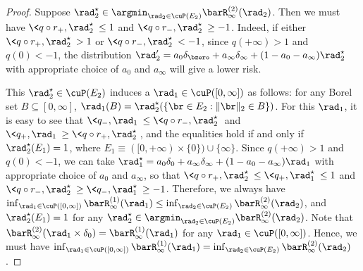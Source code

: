 \documentclass[11pt]{article}
\begin{document}
\begin{proof}
%
%
Suppose $\rad_2^\star \in \argmin_{\rad_2 \in \cuP(E_2)} \barR_\infty^{(2)}(\rad_2)$. Then we must have $\< q \circ r_+, \rad_2^\star\> \le 1$ and $\< q \circ r_-, \rad_2^\star \> \ge -1$. Indeed, if either $\< q \circ r_+, \rad_2^\star\> > 1$ or $\< q \circ r_-, \rad_2^\star\> < -1$, since $q(+\infty) > 1$ and $q(0) < -1$, the distribution $\rad_2' = a_0 \delta_\bzero + a_\infty \delta_\infty + (1-a_0 - a_\infty) \rad_2^\star$ with appropriate choice of $a_0$ and $a_\infty$ will give a lower risk. 

This $\rad_2^\star \in \cuP(E_2)$ induces a $\rad_1 \in \cuP([0, \infty])$ as follows: for any Borel set $B \subseteq [0, \infty]$, $\rad_1(B) = \rad_2^\star(\{\br \in E_2 : \| \br \|_2 \in B \})$. For this $\rad_1$, it is easy to see that $\<q_-, \rad_1 \> \le \<q \circ r_-, \rad_2^\star \>$ and $\<q_+, \rad_1 \> \ge \<q \circ r_+, \rad_2^\star \>$, and the equalities hold if and only if $\rad_2^\star(E_1) = 1$, where $E_1 \equiv  ([0, +\infty) \times \{ 0 \}) \cup \{ \infty \}$. Since $q(+\infty) > 1$ and $q(0) < -1$, we can take $\rad_1^\star = a_0 \delta_0 + a_\infty \delta_\infty + (1 - a_0 - a_\infty) \rad_1$ with appropriate choice of $a_0$ and $a_\infty$, so that $\< q \circ r_+, \rad_2^\star\> \le \< q_+, \rad_1^\star \> \le 1$ and $\< q\circ r_-, \rad_2^\star\> \ge \< q_-, \rad_1^\star\> \ge - 1$. Therefore, we always have $\inf_{\rad_1 \in \cuP([0, \infty])} \barR_\infty^{(1)}(\rad_1) \le \inf_{\rad_2 \in \cuP(E_2)} \barR_\infty^{(2)}(\rad_2)$, and $\rad_2^\star(E_1) = 1$ for any $\rad_2^\star \in \argmin_{\rad_2 \in \cuP(E_2)} \barR_\infty^{(2)}(\rad_2)$. Note that $\barR_\infty^{(2)}(\rad_1 \times \delta_0) = \barR_\infty^{(1)}(\rad_1)$ for any $\rad_1 \in \cuP([0, \infty])$. Hence, we must have $\inf_{\rad_1 \in \cuP([0, \infty])} \barR_\infty^{(1)}(\rad_1) = \inf_{\rad_2 \in \cuP(E_2)} \barR_\infty^{(2)}(\rad_2)$. 


\end{proof}
\end{document}
